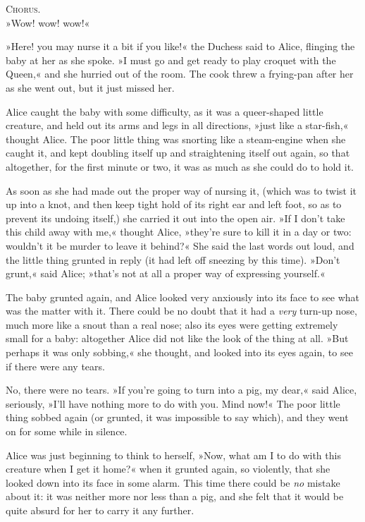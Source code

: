 \begin{center}
\textsc{Chorus.}\\
»Wow! wow! wow!«
\end{center}

»Here! you may nurse it a bit if you like!« the Duchess said to Alice, flinging the baby at her as she spoke. »I must go and get ready to play croquet with the Queen,« and she hurried out of the room. The cook threw a frying-pan after her as she went out, but it just missed her.

Alice caught the baby with some difficulty, as it was a queer-shaped little creature, and held out its arms and legs in all directions, »just like a star-fish,« thought Alice. The poor little thing was snorting like a steam-engine when she caught it, and kept doubling itself up and straightening itself out again, so that altogether, for the first minute or two, it was as much as she could do to hold it.

As soon as she had made out the proper way of nursing it, (which was to twist it up into a knot, and then keep tight hold of its right ear and left foot, so as to prevent its undoing itself,) she carried it out into the open air. »If I don't take this child away with me,« thought Alice, »they're sure to kill it in a day or two: wouldn't it be murder to leave it behind?« She said the last words out loud, and the little thing grunted in reply (it had left off sneezing by this time). »Don't grunt,« said Alice; »that's not at all a proper way of expressing yourself.«

The baby grunted again, and Alice looked very anxiously into its face to see what was the matter with it. There could be no doubt that it had a \textit{very} turn-up nose, much more like a snout than a real nose; also its eyes were getting extremely small for a baby: altogether Alice did not like the look of the thing at all. »But perhaps it was only sobbing,« she thought, and looked into its eyes again, to see if there were any tears.

No, there were no tears. »If you're going to turn into a pig, my dear,« said Alice, seriously, »I'll have nothing more to do with you. Mind now!« The poor little thing sobbed again (or grunted, it was impossible to say which), and they went on for some while in silence.

Alice was just beginning to think to herself, »Now, what am I to do with this creature when I get it home?« when it grunted again, so violently, that she looked down into its face in some alarm. This time there could be \textit{no} mistake about it: it was neither more nor less than a pig, and she felt that it would be quite absurd for her to carry it any further.

